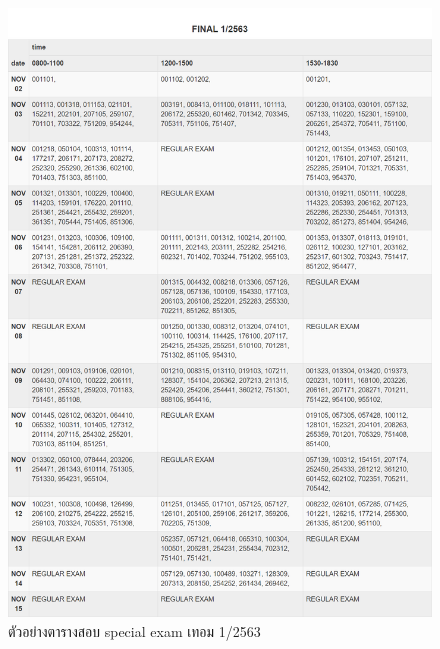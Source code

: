 \begin{figure}
    \begin{center}
      \includegraphics[width=\linewidth]{images/special_exam.png}
    \end{center}
    \caption[ตัวอย่างตารางสอบ special exam เทอม 1/2563]{ตัวอย่างตารางสอบ special exam เทอม 1/2563}
    \label{fig:special_exam}     
\end{figure}
\newpage
